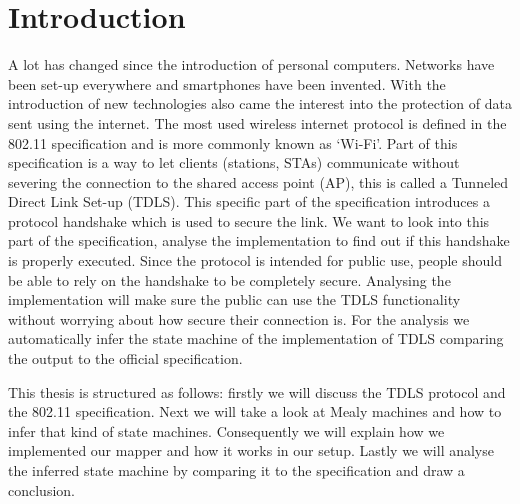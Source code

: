 \chapter{Introduction}\label{introduction}

\iffalse
The introduction of your bachelor thesis introduces the research area, the
research hypothesis, and the scientific contributions of your work.
A good narrative structure is the one suggested by Simon Peyton Jones
\cite{80211}:
%
\begin{itemize}
\item describe the problem / research question
\item motivate why this problem must be solved
\item demonstrate that a (new) solution is needed
\item explain the intuition behind your solution
\item motivate why / how your solution solves the problem (this is technical)
\item explain how it compares with related work
\end{itemize}
\fi


A lot has changed since the introduction of personal computers. Networks have been set-up everywhere and smartphones have been invented. With the introduction of new technologies also came the interest into the protection of data sent using the internet. The most used wireless internet protocol is defined in the 802.11 specification \cite{80211} and is more commonly known as ‘Wi-Fi’. Part of this specification is a way to let clients (stations, STAs) communicate without severing the connection to the shared access point (AP), this is called a Tunneled Direct Link Set-up (TDLS).  This specific part of the specification introduces a protocol handshake which is used to secure the link. We want to look into this part of the specification, analyse the implementation to find out if this handshake is properly executed. Since the protocol is intended for public use, people should be able to rely on the handshake to be completely secure. Analysing the implementation will make sure the public can use the TDLS functionality without worrying about how secure their connection is. For the analysis we automatically infer the state machine of the implementation of TDLS comparing the output to the official specification.

This thesis is structured as follows: firstly we will discuss the TDLS protocol and the 802.11 specification. Next we will take a look at Mealy machines and how to infer that kind of state machines. Consequently we will explain how we implemented our mapper and how it works in our setup. Lastly we will analyse the inferred state machine by comparing it to the specification and draw a conclusion.